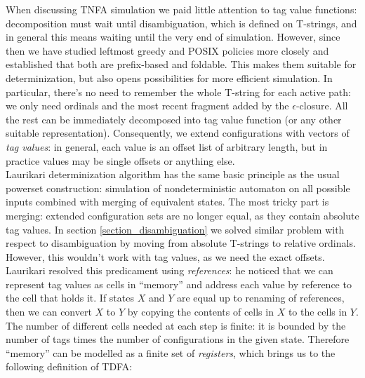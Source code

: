 \documentclass{article}
\theoremstyle{definition}
\begin{document}
\begin{multicols}{2}
When discussing TNFA simulation we paid little attention to tag value functions:
decomposition must wait until disambiguation, which is defined on T-strings,
and in general this means waiting until the very end of simulation.
However, since then we have studied leftmost greedy and POSIX policies more closely
and established that both are prefix-based and foldable.
This makes them suitable for determinization, but also opens possibilities for more efficient simulation.
In particular, there's no need to remember the whole T-string for each active path:
we only need ordinals and the most recent fragment added by the $\epsilon$-closure.
All the rest can be immediately decomposed into tag value function (or any other suitable representation).
Consequently, we extend configurations with vectors of \emph{tag values}:
in general, each value is an offset list of arbitrary length,
but in practice values may be single offsets or anything else.
\\

Laurikari determinization algorithm has the same basic principle as the usual powerset construction:
simulation of nondeterministic automaton on all possible inputs combined with merging of equivalent states.
The most tricky part is merging: extended configuration sets are no longer equal, as they contain absolute tag values.
In section \ref{section_disambiguation} we solved similar problem with respect to disambiguation
by moving from absolute T-strings to relative ordinals.
However, this wouldn't work with tag values, as we need the exact offsets.
Laurikari resolved this predicament using \emph{references}:
he noticed that we can represent tag values as cells in ``memory'' and address each value by reference to the cell that holds it.
If states $X$ and $Y$ are equal up to renaming of references,
then we can convert $X$ to $Y$ by copying the contents of cells in $X$ to the cells in $Y$.
The number of different cells needed at each step is finite:
it is bounded by the number of tags times the number of configurations in the given state.
Therefore ``memory'' can be modelled as a finite set of \emph{registers},
which brings us to the following definition of TDFA:


\end{multicols}
\end{document}
